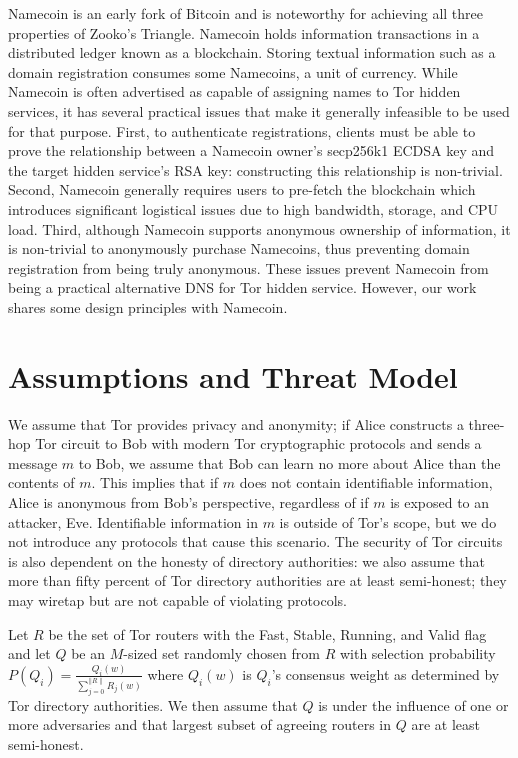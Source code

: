 \documentclass[conference]{IEEEtran}
\newcommand*\concat{\mathbin{\|}}
\begin{document}
Namecoin\cite{NamecoinHome} is an early fork of Bitcoin\cite{nakamoto2008bitcoin} and is noteworthy for achieving all three properties of Zooko's Triangle. Namecoin holds information transactions in a distributed ledger known as a blockchain. Storing textual information such as a domain registration consumes some Namecoins, a unit of currency. While Namecoin is often advertised as capable of assigning names to Tor hidden services, it has several practical issues that make it generally infeasible to be used for that purpose. First, to authenticate registrations, clients must be able to prove the relationship between a Namecoin owner's secp256k1 ECDSA key and the target hidden service's RSA key: constructing this relationship is non-trivial. Second, Namecoin generally requires users to pre-fetch the blockchain which introduces significant logistical issues due to high bandwidth, storage, and CPU load. Third, although Namecoin supports anonymous ownership of information, it is non-trivial to anonymously purchase Namecoins, thus preventing domain registration from being truly anonymous. These issues prevent Namecoin from being a practical alternative DNS for Tor hidden service. However, our work shares some design principles with Namecoin.

\section{Assumptions and Threat Model}
\label{sec:threatModel}

We assume that Tor provides privacy and anonymity; if Alice constructs a three-hop Tor circuit to Bob with modern Tor cryptographic protocols and sends a message $ m $ to Bob, we assume that Bob can learn no more about Alice than the contents of $ m $. This implies that if $ m $ does not contain identifiable information, Alice is anonymous from Bob's perspective, regardless of if $ m $ is exposed to an attacker, Eve. Identifiable information in $ m $ is outside of Tor's scope, but we do not introduce any protocols that cause this scenario. The security of Tor circuits is also dependent on the honesty of directory authorities: we also assume that more than fifty percent of Tor directory authorities are at least semi-honest; they may wiretap but are not capable of violating protocols. 

Let $ R $ be the set of Tor routers with the Fast, Stable, Running, and Valid flag and let $ Q $ be an $ M $-sized set randomly chosen from $ R $ with selection probability $ P (Q_{i}) = \frac{Q_{i}(w)}{\sum_{j=0}^{\concat R \concat} R_{j}(w)} $ where $ Q_{i}(w) $ is $ Q_{i} $'s consensus weight as determined by Tor directory authorities. We then assume that $ Q $ is under the influence of one or more adversaries and that largest subset of agreeing routers in $ Q $ are at least semi-honest.
\end{document}
